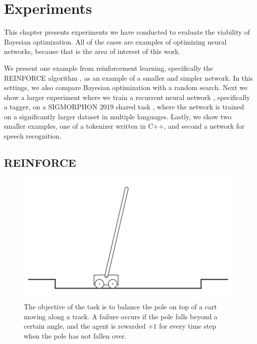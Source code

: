 \chapter{Experiments}
\label{chapter:experiments}

This chapter presents experiments we have conducted to evaluate the viability of Bayesian optimization. All of the cases are examples of optimizing neural networks, because that is the area of interest of this work.

We present one example from reinforcement learning, specifically the REINFORCE algorithm \citep{suttonbarto2018reinforcement}, as an example of a smaller and simpler network. In this settings, we also compare Bayesian optimization with a random search. Next we show a larger experiment where we train a recurrent neural network \citep{dlbook}, specifically a tagger, on a SIGMORPHON 2019 shared task \citep{sigmorphon2019task2}, where the network is trained on a significantly larger dataset in multiple languages. Lastly, we show two smaller examples, one of a tokenizer written in C++, and second a network for speech recognition.

\section{REINFORCE}
\label{section:experiments-empirical-bayes}

\begin{figure}[t]
	\begin{center}
		\includegraphics[width=1.0\textwidth]{images/cartpole.png}
		\caption{The objective of the task is to balance the pole on top of a cart moving along
			a track. A failure occurs if the pole falls beyond a certain angle, and the agent
			is rewarded $+1$ for every time step when the pole has not fallen over.}
		\label{figure:cartpole}
	\end{center}
\end{figure}

